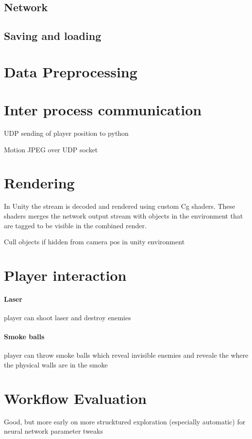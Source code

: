 \documentclass[a4paper, twoside, 10pt]{report}
\begin{document}
\subsection{Network} \label{Network}


\subsection{Saving and loading}
\section{Data Preprocessing}
\section{Inter process communication}
UDP sending of player position to python

Motion JPEG over UDP socket 

\section{Rendering}
In Unity the stream is decoded and rendered using custom Cg shaders. These shaders merges the network output stream with objects in the environment that are tagged to be visible in the combined render.

Cull objects if hidden from camera pos in unity environment

\section{Player interaction}
\paragraph{Laser}
player can shoot laser and destroy enemies

\paragraph{Smoke balls}
player can throw smoke balls which reveal invisible enemies and reveale the where the physical walls are in the smoke



\section{Workflow Evaluation}
Good, but more early on more strucktured exploration (especially automatic) for neural network parameter tweaks
\end{document}
